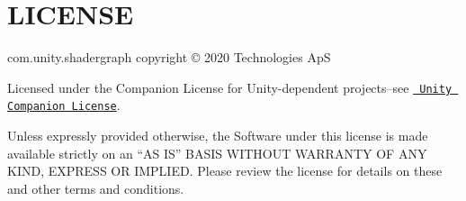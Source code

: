 \chapter{LICENSE}
\hypertarget{md__hey_tea_9_2_library_2_package_cache_2com_8unity_8shadergraph_0d14_80_88_2_l_i_c_e_n_s_e}{}\label{md__hey_tea_9_2_library_2_package_cache_2com_8unity_8shadergraph_0d14_80_88_2_l_i_c_e_n_s_e}
com.\+unity.\+shadergraph copyright © 2020  Technologies ApS

Licensed under the  Companion License for Unity-\/dependent projects--see \href{http://www.unity3d.com/legal/licenses/Unity_Companion_License}{\texttt{ Unity Companion License}}.

Unless expressly provided otherwise, the Software under this license is made available strictly on an “\+AS IS” BASIS WITHOUT WARRANTY OF ANY KIND, EXPRESS OR IMPLIED. Please review the license for details on these and other terms and conditions. 